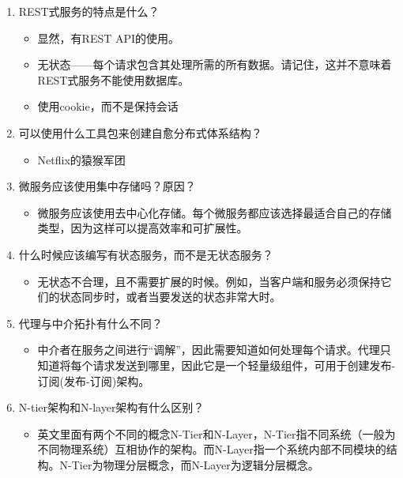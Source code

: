 \begin{enumerate}
\item
REST式服务的特点是什么？

\begin{itemize}
\item 
显然，有REST API的使用。

\item 
无状态——每个请求包含其处理所需的所有数据。请记住，这并不意味着REST式服务不能使用数据库。

\item 
使用cookie，而不是保持会话
\end{itemize}

\item
可以使用什么工具包来创建自愈分布式体系结构？

\begin{itemize}
\item 
Netflix的猿猴军团
\end{itemize}

\item
微服务应该使用集中存储吗？原因？

\begin{itemize}
\item 
微服务应该使用去中心化存储。每个微服务都应该选择最适合自己的存储类型，因为这样可以提高效率和可扩展性。
\end{itemize}

\item
什么时候应该编写有状态服务，而不是无状态服务？

\begin{itemize}
\item 
无状态不合理，且不需要扩展的时候。例如，当客户端和服务必须保持它们的状态同步时，或者当要发送的状态非常大时。
\end{itemize}

\item
代理与中介拓扑有什么不同？

\begin{itemize}
\item 
中介者在服务之间进行“调解”，因此需要知道如何处理每个请求。代理只知道将每个请求发送到哪里，因此它是一个轻量级组件，可用于创建发布-订阅(发布-订阅)架构。
\end{itemize}

\item
N-tier架构和N-layer架构有什么区别？

\begin{itemize}
\item 
英文里面有两个不同的概念N-Tier和N-Layer，N-Tier指不同系统（一般为不同物理系统）互相协作的架构。而N-Layer指一个系统内部不同模块的结构。N-Tier为物理分层概念，而N-Layer为逻辑分层概念。


\end{itemize}
\end{enumerate}
